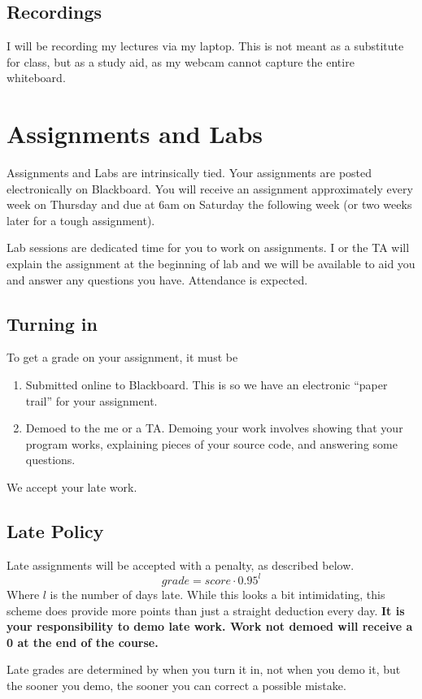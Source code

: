 \documentclass[10pt, letter]{article}
\begin{document}
\subsection*{Recordings}
I will be recording my lectures via my laptop.
This is not meant as a substitute for class, but as a study aid, as my webcam cannot capture the entire whiteboard.

\section{Assignments and Labs}
Assignments and Labs are intrinsically tied.
Your assignments are posted electronically on Blackboard.
You will receive an assignment approximately every week on Thursday and due at 6am on Saturday the following week (or two weeks later for a tough assignment).

Lab sessions are dedicated time for you to work on assignments.
I or the TA will explain the assignment at the beginning of lab and we will be available to aid you and answer any questions you have.
Attendance is expected.


\subsection*{Turning in}
To get a grade on your assignment, it must be 
\begin{enumerate}
	\item Submitted online to Blackboard.  This is so we have an electronic ``paper trail'' for your assignment.
	\item Demoed to the me or a TA.  Demoing your work involves showing that your program works, explaining pieces of your source code, and answering some questions.
\end{enumerate}

We accept your late work. 



\subsection*{Late Policy}
Late assignments will be accepted with a penalty, as described below.  $$grade = score \cdot 0.95^{l}$$
Where $l$ is the number of days late.  While this looks a bit intimidating, this scheme does provide more points than just a straight deduction every day. \textbf{It is your responsibility to demo late work.  Work not demoed will receive a 0 at the end of the course.}

Late grades are determined by when you turn it in, not when you demo it, but the sooner you demo, the sooner you can correct a possible mistake. 
\end{document}
